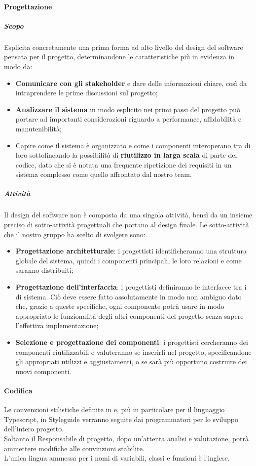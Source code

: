 \paragraph{Progettazione}
\subparagraph{Scopo}\Spazio
Esplicita concretamente una prima forma ad alto livello del design del software pensata per il progetto, determinandone le caratteristiche più in evidenza in modo da:
	\begin{itemize}
	\item \textbf{{Comunicare con gli stakeholder}} e dare delle informazioni chiare, così da intraprendere le prime discussioni sul progetto;
	\item \textbf{{Analizzare il sistema}} in modo esplicito nei primi passi del progetto può portare ad importanti considerazioni riguardo a performance, affidabilità e manutenibilità;
	\item Capire come il sistema è organizzato e come i componenti interoperano tra di loro sottolineando la possibilità di \textbf{{riutilizzo in larga scala}} di parte del codice, dato che si è notata una frequente ripetizione dei requisiti in un sistema complesso come quello affrontato dal nostro team.
	\end{itemize}
\subparagraph{Attività}\Spazio
Il design del software non è composta da una singola attività, bensì da un insieme preciso di sotto-attività progettuali che portano al design finale.
Le sotto-attività che il nostro gruppo ha scelto di svolgere sono:
	\begin{itemize}
	\item\textbf{{Progettazione architetturale}}: i progettisti identificheranno una struttura globale del sistema, quindi i componenti principali, le loro relazioni e come saranno distribuiti;
	\item\textbf{{Progettazione dell'interfaccia}}: i progettisti definiranno le interfacce tra i  di sistema. Ciò deve essere fatto assolutamente in modo non ambiguo dato che, grazie a queste specifiche, ogni componente potrà usare in modo appropriato le funzionalità degli altri componenti del progetto senza sapere l'effettiva implementazione;
	\item\textbf{{Selezione e progettazione dei componenti}}: i progettisti cercheranno dei componenti riutilizzabili e valuteranno se inserirli nel progetto, specificandone gli appropriati utilizzi e aggiustamenti, o se sarà più opportuno costruire dei nuovi componenti.
\end{itemize}
\paragraph{Codifica}\Spazio
Le convenzioni stilistiche definite in  e, più in particolare per il linguaggio Typescript, in  Styleguide verranno seguite dai programmatori per lo sviluppo dell'intero progetto. \\
Soltanto il Responsabile di progetto, dopo un'attenta analisi e valutazione, potrà ammettere modifiche alle convinzioni stabilite.\\
L’unica lingua ammessa per i nomi di variabili, classi e funzioni è l’inglese.

